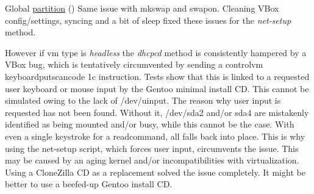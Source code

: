 
\begin{DoxyRefList}
\item[Global \mbox{\hyperlink{group__mk_file_system_gaa9952b2711fe0413d7a0bc6639c7f5a5}{partition}} ()]\label{bug__bug000001}%
%
Same issue with mkswap and swapon. Cleaning V\+Box config/settings, syncing and a bit of sleep fixed these issues for the {\itshape net-\/setup} method. 

However if vm type is {\itshape \textquotesingle{}headless\textquotesingle{}} the {\itshape dhcpcd} method is consistently hampered by a V\+Box bug, which is tentatively circumvented by sending a {\ttfamily controlvm keyboardputscancode 1c} instruction. Tests show that this is linked to a requested user keyboard or mouse input by the Gentoo minimal install CD. This cannot be simulated owing to the lack of /dev/uinput. The reason why user input is requested has not been found. Without it, /dev/sda2 and/or sda4 are mistakenly identified as being mounted and/or busy, while this cannot be the case. With even a single keystroke for a {\ttfamily read}command, all falls back into place. This is why using the net-\/setup script, which forces user input, circumvents the issue. This may be caused by an aging kernel and/or incompatibilities with virtualization. Using a Clone\+Zilla CD as a replacement solved the issue completely. It might be better to use a beefed-\/up Gentoo install CD. 
\end{DoxyRefList}